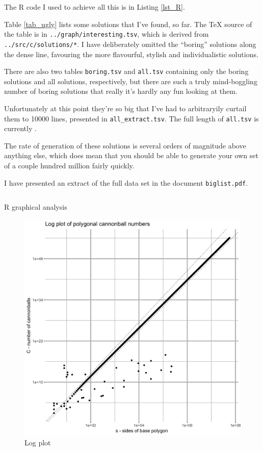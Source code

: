 The R code I used to achieve all this is in Listing \ref{lst_R}.

Table \ref{tab_ugly} lists some solutions that I've found, so far. The \TeX{}
source of the table is in \texttt{../graph/interesting.tsv}, which is derived
from \texttt{../src/c/solutions/*}.  I have deliberately omitted the ``boring''
solutions along the dense line, favouring the more flavourful, stylish and
individualistic solutions.

There are also two tables \texttt{boring.tsv} and \texttt{all.tsv} containing
only the boring solutions and all solutions, respectively, but there are such a
truly mind-boggling number of boring solutions that really it's hardly any fun
looking at them.

Unfortunately at this point they're so big that I've had to arbitraryily curtail
them to 10000 lines, presented in \texttt{all\_extract.tsv}. The full length of
\texttt{all.tsv} is currently .

The rate of generation of these solutions is several orders of
magnitude above anything else, which does mean that you should be able to
generate your own set of a couple hundred million fairly quickly.

I have presented an extract of the full data set in the document
\texttt{biglist.pdf}.

\begin{longlisting}
\inputminted{R}{../graph/graph.R}
\caption{R graphical analysis}
\label{lst_R}
\end{longlisting}

\begin{figure}[H]
\centering
\includegraphics[width=\textwidth]{../graph/all_log.png}
\caption{Log plot}
\label{fig_log_all}
\end{figure}

